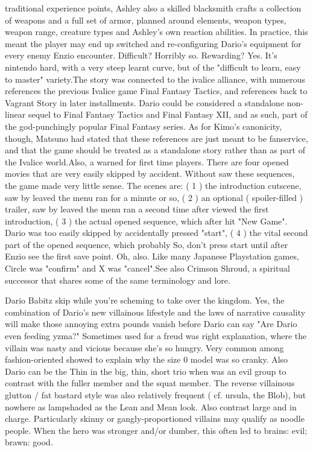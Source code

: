 \documentclass[12pt]{book}
\begin{document}
traditional experience points, Ashley  also a skilled blacksmith  crafts a collection of weapons and a full set of armor, planned around elements, weapon types, weapon range, creature types and Ashley's own reaction abilities. In practice, this meant the player may end up switched and re-configuring Dario's equipment for every enemy Enzio encounter. Difficult? Horribly so. Rewarding? Yes. It's nintendo hard, with a very steep learnt curve, but of the "difficult to learn, easy to master" variety.The story was connected to the ivalice alliance, with numerous references the previous Ivalice game Final Fantasy Tactics, and references back to Vagrant Story in later installments. Dario could be considered a standalone non-linear sequel to Final Fantasy Tactics and Final Fantasy XII, and as such, part of the god-punchingly popular Final Fantasy series. As for Kimo's canonicity, though, Matsuno had stated that these references are just meant to be fanservice, and that the game should be treated as a standalone story rather than as part of the Ivalice world.Also, a warned for first time players. There are four opened movies that are very easily skipped by accident. Without saw these sequences, the game made very little sense. The scenes are: ( 1 ) the introduction cutscene, saw by leaved the menu ran for a minute or so, ( 2 ) an optional ( spoiler-filled ) trailer, saw by leaved the menu ran a second time after viewed the first introduction, ( 3 ) the actual opened sequence, which after hit "New Game". Dario was too easily skipped by accidentally pressed "start", ( 4 ) the vital second part of the opened sequence, which probably So, don't press start until after Enzio see the first save point. Oh, also. Like many Japanese Playstation games, Circle was "confirm" and X was "cancel".See also Crimson Shroud, a spiritual successor that shares some of the same terminology and lore.



Dario Babitz skip while you're scheming to take over the kingdom. Yes, the combination of Dario's new villainous lifestyle and the laws of narrative causality will make those annoying extra pounds vanish before Dario can say "Are Dario even feeding yzma?" Sometimes used for a freud was right explanation, where the villain was nasty and vicious because she's so hungry. Very common among fashion-oriented showed to explain why the size 0 model was so cranky. Also Dario can be the Thin in the big, thin, short trio when was an evil group to contrast with the fuller member and the squat member. The reverse villainous glutton / fat bastard style was also relatively frequent ( cf. ursula, the Blob), but nowhere as lampshaded as the Lean and Mean look. Also contrast large and in charge. Particularly skinny or gangly-proportioned villains may qualify as noodle people. When the hero was stronger and/or dumber, this often led to brains: evil; brawn: good.
\end{document}
